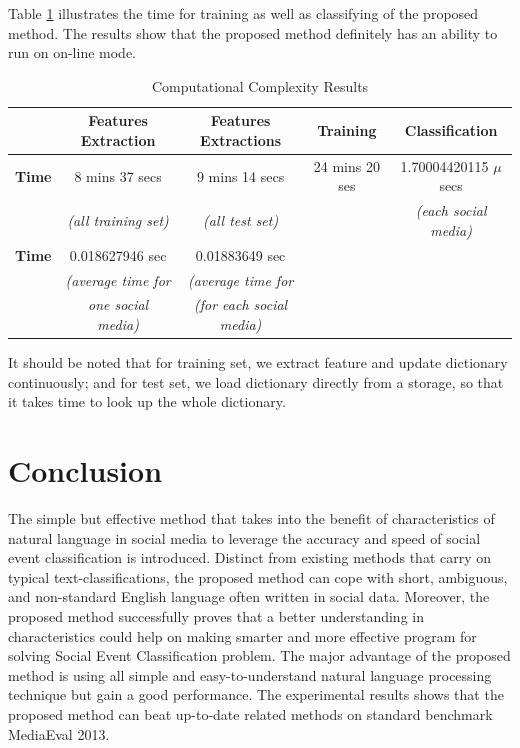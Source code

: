 \documentclass{llncs}
\begin{document}
Table \ref{tab5} illustrates the time for training as well as classifying of the proposed method. The results show that the proposed method definitely has an ability to run on on-line mode.

\begin{table}[htb]
\caption{Computational Complexity Results}
\begin{center}
\begin{tabular}{|l|c|c|c|c|}
\hline
\multicolumn{1}{|c|}{} & \textbf{Features Extraction} & \textbf{Features Extractions} & \textbf{Training} & \textbf{Classification} \\ \hline
\textbf{Time}                  & 8 mins 37 secs             & 9 mins 14 secs & 24 mins 20 ses & 1.70004420115 $\mu$secs      \\ 
                  & \textit{(all training set)}             & \textit{(all test set)} &  &  \textit{(each social media)}     \\ \hline
\textbf{Time}                  & 0.018627946 sec           & 0.01883649 sec &   &       \\ 
                  & \textit{(average time for}             & \textit{(average time for} &  &       \\ 
                 & \textit{one social media)}             &  \textit{(for each social media)} &   &       \\ \hline
                  
\end{tabular}

\end{center}
\label{tab5}
\end{table}

It should be noted that for training set, we extract feature and update dictionary continuously; and for test set, we load dictionary directly from a storage, so that it takes time to look up the whole dictionary.

\section{Conclusion}
\label{conc}

The simple but effective method that takes into the benefit of characteristics of natural language in social media to leverage the accuracy and speed of social event classification is introduced. Distinct from existing methods that carry on typical text-classifications, the proposed method can cope with short, ambiguous, and non-standard English language often written in social data. Moreover, the proposed method successfully proves that a better understanding in characteristics could help on making smarter and more effective program for solving Social Event Classification problem. The major advantage of the proposed method is using all simple and easy-to-understand natural language processing technique but gain a good performance. The experimental results shows that the proposed method can beat up-to-date related methods on standard benchmark MediaEval 2013. 
\end{document}
